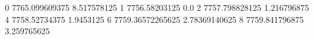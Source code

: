 0 7765.099609375 8.517578125
1 7756.58203125 0.0
2 7757.798828125 1.216796875
4 7758.52734375 1.9453125
6 7759.36572265625 2.78369140625
8 7759.841796875 3.259765625
